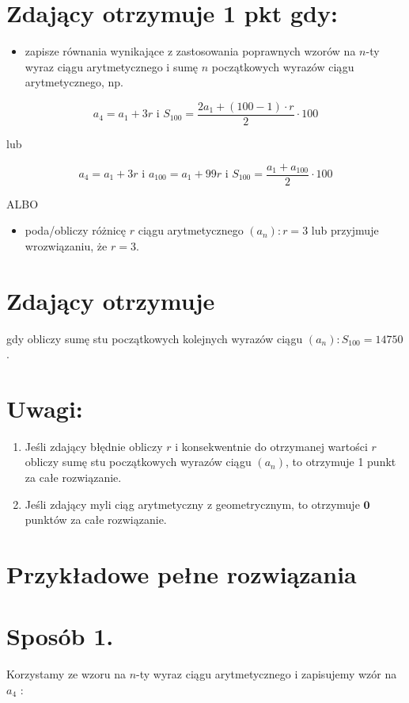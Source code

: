 \documentclass[10pt]{article}
\begin{document}
\section*{Zdający otrzymuje 1 pkt gdy:}
\begin{itemize}
  \item zapisze równania wynikające z zastosowania poprawnych wzorów na $n$-ty wyraz ciągu arytmetycznego i sumę $n$ początkowych wyrazów ciągu arytmetycznego, np.
\end{itemize}

$$
a_{4}=a_{1}+3 r \text { i } S_{100}=\frac{2 a_{1}+(100-1) \cdot r}{2} \cdot 100
$$

lub

$$
a_{4}=a_{1}+3 r \text { i } a_{100}=a_{1}+99 r \text { i } S_{100}=\frac{a_{1}+a_{100}}{2} \cdot 100
$$

ALBO

\begin{itemize}
  \item poda/obliczy różnicę $r$ ciągu arytmetycznego $\left(a_{n}\right): r=3$ lub przyjmuje wrozwiązaniu, że $r=3$.
\end{itemize}

\section*{Zdający otrzymuje}
gdy obliczy sumę stu początkowych kolejnych wyrazów ciągu $\left(a_{n}\right): S_{100}=14750$.

\section*{Uwagi:}
\begin{enumerate}
  \item Jeśli zdający błędnie obliczy $r$ i konsekwentnie do otrzymanej wartości $r$ obliczy sumę stu początkowych wyrazów ciągu $\left(a_{n}\right)$, to otrzymuje 1 punkt za całe rozwiązanie.
  \item Jeśli zdający myli ciąg arytmetyczny z geometrycznym, to otrzymuje $\mathbf{0}$ punktów za całe rozwiązanie.
\end{enumerate}

\section*{Przykładowe pełne rozwiązania}
\section*{Sposób 1.}
Korzystamy ze wzoru na $n$-ty wyraz ciągu arytmetycznego i zapisujemy wzór na $a_{4}$ :
\end{document}
